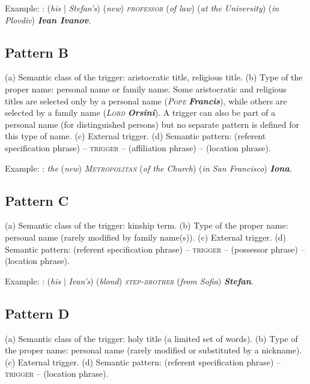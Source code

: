 \documentclass[output=paper]{langsci/langscibook}
\newcommand{\trigger}[1]{\textsc{#1}}
\begin{document}
\medskip 

Example: : (\textit{his} | \textit{Stefan's}) (\textit{new})
\textit{\trigger{professor}} (\textit{of law}) (\textit{at the
University}) (\textit{in Plovdiv}) \textbf{\textit{Ivan
Ivanov}}\textit{.}



\subsection{Pattern B}

(a) Semantic class of the trigger: aristocratic title, religious title.
(b) Type of the proper name: personal name or family name. Some
aristocratic and religious titles are selected only by a personal name
(\textit{\trigger{Pope}}\textit{ }\textbf{\textit{Francis}}), while
others are selected by a family name (\textit{\trigger{Lord}}\textit{
}\textbf{\textit{Orsini}}). A trigger can also be part of a personal
name (for distinguished persons) but no separate pattern is defined for this type of name\textit{.} (c) External trigger. (d) Semantic pattern:
(referent specification phrase) – \trigger{trigger} – (affiliation
phrase) – (location phrase).

\medskip 


Example: : \textit{the }(\textit{new})\textit{
}\textit{\trigger{Metropolitan}} (\textit{of the Church}) (\textit{in San
Francisco})\textit{ }\textbf{\textit{Iona}}\textit{.}

\subsection{Pattern C}
\largerpage
(a) Semantic class of the trigger: kinship term. (b) Type of the proper
name: personal name (rarely modified by family name(s)). (c) External
trigger. (d) Semantic pattern: (referent specification phrase) –
\trigger{trigger} – (possessor phrase) – (location phrase).


\smallskip 

Example: : (\textit{his} | \textit{Ivan's}) (\textit{blond})\textit{
}\textit{\trigger{step-brother}} (\textit{from Sofia})\textit{
}\textbf{\textit{Stefan}}.

\subsection{Pattern D}

(a) Semantic class of the trigger: holy title (a limited set of words).
(b) Type of the proper name: personal name (rarely modified or
substituted by a nickname). (c) External trigger. (d) Semantic pattern:
(referent specification phrase) – \trigger{trigger} – (location phrase).
\end{document}
